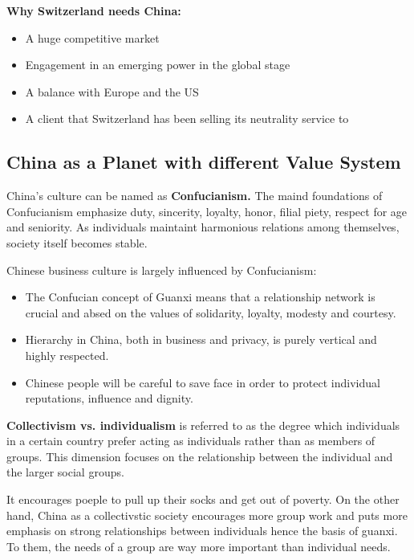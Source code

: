 \documentclass[a4paper]{extarticle}
\begin{document}
\textbf{Why Switzerland needs China:}

\begin{itemize}
    \item A huge competitive market
    \item Engagement in an emerging power in the global stage
    \item A balance with Europe and the US
    \item A client that Switzerland has been selling its neutrality service to
\end{itemize}

\subsection{China as a Planet with different Value System}

China's culture can be named as \textbf{Confucianism.} The maind foundations of Confucianism emphasize duty, sincerity, loyalty, honor, filial piety, respect for age and seniority. As individuals maintaint harmonious relations among themselves, society itself becomes stable.

Chinese business culture is largely influenced by Confucianism:

\begin{itemize}
    \item The Confucian concept of Guanxi means that a relationship network is crucial and absed on the values of solidarity, loyalty, modesty and courtesy.
    \item Hierarchy in China, both in business and privacy, is purely vertical and highly respected.
    \item Chinese people will be careful to save face in order to protect individual reputations, influence and dignity.
\end{itemize}

\textbf{Collectivism vs. individualism} is referred to as the degree which individuals in a certain country prefer acting as individuals rather than as members of groups. This dimension focuses on the relationship between the individual and the larger social groups.

It encourages poeple to pull up their socks and get out of poverty. On the other hand, China as a collectivstic society encourages more group work and puts more emphasis on strong relationships between individuals hence the basis of guanxi. To them, the needs of a group are way more important than individual needs.
\end{document}
